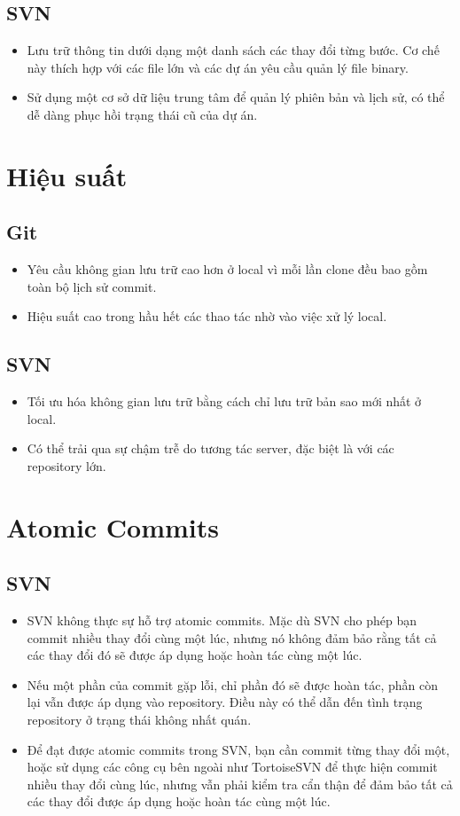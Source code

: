 \subsection{SVN}
\begin{itemize}
    \item Lưu trữ thông tin dưới dạng một danh sách các thay đổi từng bước. Cơ chế này thích hợp với các file lớn và các dự án yêu cầu quản lý file binary.
    \item Sử dụng một cơ sở dữ liệu trung tâm để quản lý phiên bản và lịch sử, có thể dễ dàng phục hồi trạng thái cũ của dự án.
\end{itemize}

\section{Hiệu suất}
\subsection{Git}
\begin{itemize}
    \item Yêu cầu không gian lưu trữ cao hơn ở local vì mỗi lần clone đều bao gồm toàn bộ lịch sử commit.
    \item Hiệu suất cao trong hầu hết các thao tác nhờ vào việc xử lý local.
\end{itemize}

\subsection{SVN}
\begin{itemize}
    \item Tối ưu hóa không gian lưu trữ bằng cách chỉ lưu trữ bản sao mới nhất ở local.
    \item Có thể trải qua sự chậm trễ do tương tác server, đặc biệt là với các repository lớn.
\end{itemize}


\section{Atomic Commits}
\subsection{SVN}
\begin{itemize}
    \item SVN không thực sự hỗ trợ atomic commits. Mặc dù SVN cho phép bạn commit nhiều thay đổi cùng một lúc, nhưng nó không đảm bảo rằng tất cả các thay đổi đó sẽ được áp dụng hoặc hoàn tác cùng một lúc.
    \item Nếu một phần của commit gặp lỗi, chỉ phần đó sẽ được hoàn tác, phần còn lại vẫn được áp dụng vào repository. Điều này có thể dẫn đến tình trạng repository ở trạng thái không nhất quán.
    \item Để đạt được atomic commits trong SVN, bạn cần commit từng thay đổi một, hoặc sử dụng các công cụ bên ngoài như TortoiseSVN để thực hiện commit nhiều thay đổi cùng lúc, nhưng vẫn phải kiểm tra cẩn thận để đảm bảo tất cả các thay đổi được áp dụng hoặc hoàn tác cùng một lúc.
\end{itemize}

